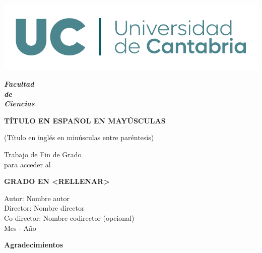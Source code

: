 \documentclass{article}
\begin{document}
\begin{titlepage}
{\selectfont

\begin{center}
\vspace*{-2.5cm}

\includegraphics[width=\linewidth]{images/logoUC.pdf}

\vspace{1cm}

\textbf{\Huge\emph{Facultad \\ de\\ Ciencias}}

\vspace{2cm}

{\fontsize{20}{24}\selectfont \textbf{TÍTULO EN ESPAÑOL EN MAYÚSCULAS}}

\vspace{\baselineskip}

{\fontsize{19}{24}\selectfont (Título en inglés en minúsculas entre paréntesis)}

\vspace{1.5cm}

{\fontsize{14}{17}\selectfont Trabajo de Fin de Grado\\
para acceder al}

\vspace{0.5cm}

{\fontsize{17}{20}\selectfont \textbf{GRADO EN <RELLENAR>}}

\vfill

\begin{flushright}
\fontsize{17}{20}\selectfont
Autor: Nombre autor\\
Director: Nombre director\\
Co-director: Nombre codirector (opcional)\\
Mes - Año
\end{flushright}
\end{center}
}
\end{titlepage}


\newpage
\begin{center}
{\bf \Huge Agradecimientos}
\end{center}
\vspace{1cm}
\setlength{\baselineskip}{0.8cm}
\onehalfspacing
\begin{flushleft}



\end{flushleft}
\end{document}
